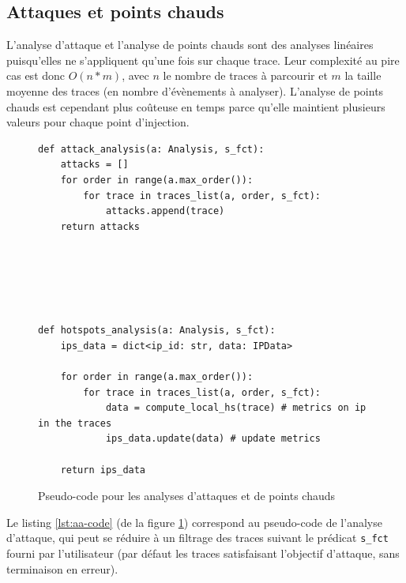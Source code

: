  		\subsection{Attaques et points chauds}
 		\label{sec:lazart-impl-analysis-linear}
 		
 		    L'analyse d'attaque et l'analyse de points chauds sont des analyses linéaires puisqu'elles ne s'appliquent qu'une fois sur chaque trace. Leur complexité au pire cas est donc $O(n * m)$, avec $n$ le nombre de traces à parcourir et $m$ la taille moyenne des traces (en nombre d'évènements à analyser).
 		    L'analyse de points chauds est cependant plus coûteuse en temps parce qu'elle maintient plusieurs valeurs pour chaque point d'injection.  
 		    
            \begin{figure}[H]\centering
            \begin{multicols}{2}
\begin{lstlisting}
def attack_analysis(a: Analysis, s_fct):
    attacks = []
    for order in range(a.max_order()):
        for trace in traces_list(a, order, s_fct):
            attacks.append(trace)
    return attacks






\end{lstlisting}  
\columnbreak

\begin{lstlisting}
def hotspots_analysis(a: Analysis, s_fct):
    ips_data = dict<ip_id: str, data: IPData>
    
    for order in range(a.max_order()):
        for trace in traces_list(a, order, s_fct):
            data = compute_local_hs(trace) # metrics on ip in the traces
            ips_data.update(data) # update metrics
    
    return ips_data
\end{lstlisting}  
\end{multicols}
            \caption{Pseudo-code pour les analyses d'attaques et de points chauds}
            \label{fig:implem-aa-hs}
            \end{figure}
            
            Le listing \ref{lst:aa-code} (de la figure \ref{fig:implem-aa-hs}) correspond au pseudo-code de l'analyse d'attaque, qui peut se réduire à un filtrage des traces suivant le prédicat \texttt{s\_fct} fourni par l'utilisateur (par défaut les traces satisfaisant l'objectif d'attaque, sans terminaison en erreur).
            
